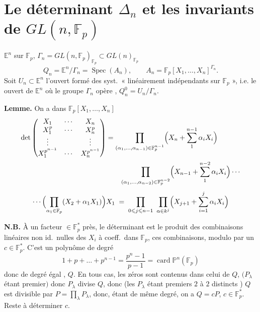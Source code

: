 \documentclass[11pt,a4paper]{article}
\begin{document}
\section*{Le déterminant $\Delta_n$ et les invariants de $GL(n,\mathbb{F}_p)$}

$\mathbb{E}^n$ sur $\mathbb{F}_p$, $\Gamma_n = GL(n, \mathbb{F}_p)_{\mathbb{F}_p}
\subset GL(n)_{\mathbb{F}_p}$
\[
  Q_n = \mathbb{E}^n/\Gamma_n = \operatorname{Spec}(A_n), \qquad
  A_n = \mathbb{F}_p[X_1, \dots, X_n]^{\Gamma_n} .
\]
Soit $U_n \subset \mathbb{E}^n$ l'ouvert formé des syst.\ « linéairement indépendants
sur $\mathbb{F}_p$ », i.e. le  ouvert de $\mathbb{E}^n$ où le groupe
$\Gamma_n$ opère , $Q_n^0 = U_n/\Gamma_n$.

\textbf{Lemme.} On a \struck{\ill{}} dans $\mathbb{F}_p[X_1, \dots, X_n]$
\begin{align*}
  \det\begin{pmatrix}
    X_1 & \cdots & X_n \\
    X_1^{p} & \cdots & X_n^{p} \\
    \vdots & & \vdots \\
    X_1^{p^{n-1}} & \cdots & X_n^{p^{n-1}}
  \end{pmatrix}
  &= \prod_{(\alpha_1, \dots, \alpha_{n-1}) \in \mathbb{F}_p^{n-1}}\Bigl(X_n + \sum_1^{n-1}\alpha_i X_i\Bigr) \\
  &\qquad \prod_{(\alpha_1, \dots, \alpha_{n-2}) \in \mathbb{F}_p^{n-2}}\Bigl(X_{n-1} + \sum_1^{n-2}\alpha_i X_i\Bigr)\cdots
\end{align*}
\[
  \cdots \Bigl(\prod_{\alpha_1 \in \mathbb{F}_p}(X_2 + \alpha_1 X_1)\Bigr) X_1
  \;=\; \prod_{0 \leqslant j \leqslant n-1}\ \prod_{\alpha \in k^j}\Bigl(X_{j+1} + \sum_{i=1}^{j}\alpha_i X_i\Bigr)
\]

\textbf{N.B.} À un facteur $\in \mathbb{F}_p^*$ près, le déterminant est le produit
des combinaisons linéaires non \struck{\ill{}} id.\ nulles des $X_i$ à coeff.\ dans
$\mathbb{F}_p$, \struck{\ill{}} ces combinaisons, modulo \ill{}
\struck{\ill{}}  par un $c \in \mathbb{F}_p^*$.
C'est un polynôme de degré
\[
  1 + p + \dots + p^{n-1} = \frac{p^n - 1}{p-1} = \operatorname{card} \mathbb{P}^n(\mathbb{F}_p)
\]
donc de degré égal , $Q$. En tous cas, les zéros
  sont contenus dans
celui de $Q$, $(P_\lambda$ étant premier$)$ \struck{\ill{}} donc $P_\lambda$ divise
$Q$, donc (les $P_\lambda$ étant premiers $2$ à $2$ distincts )
$Q$ est divisible par $P = \prod_\lambda P_\lambda$, donc, étant de même degré, on a
$Q = cP$, $c \in \mathbb{F}_p^*$. Reste à déterminer $c$.
\end{document}
